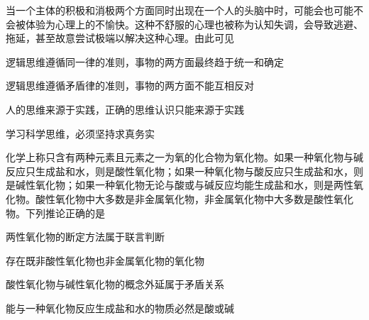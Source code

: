 \documentclass{exam-zh}
\begin{document}
\begin{question}
  当一个主体的积极和消极两个方面同时出现在一个人的头脑中时，可能会也可能不会被体验为心理上的不愉快。这种不舒服的心理也被称为认知失调，会导致逃避、拖延，甚至故意尝试极端以解决这种心理。由此可见

   逻辑思维遵循同一律的准则，事物的两方面最终趋于统一和确定

   逻辑思维遵循矛盾律的准则，事物的两方面不能互相反对

   人的思维来源于实践，正确的思维认识只能来源于实践

   学习科学思维，必须坚持求真务实

  \begin{choices}
  \item {}
  \item {}
  \item {}
  \item {}
  \end{choices}
\end{question}

\begin{question}
  化学上称只含有两种元素且元素之一为氧的化合物为氧化物。如果一种氧化物与碱反应只生成盐和水，则是酸性氧化物；如果一种氧化物与酸反应只生成盐和水，则是碱性氧化物；如果一种氧化物无论与酸或与碱反应均能生成盐和水，则是两性氧化物。酸性氧化物中大多数是非金属氧化物，非金属氧化物中大多数是酸性氧化物。下列推论正确的是

   两性氧化物的断定方法属于联言判断

   存在既非酸性氧化物也非金属氧化物的氧化物

   酸性氧化物与碱性氧化物的概念外延属于矛盾关系

   能与一种氧化物反应生成盐和水的物质必然是酸或碱

  \begin{choices}
  \item {}
  \item {}
  \item {}
  \item {}
  \end{choices}
\end{question}
\end{document}
